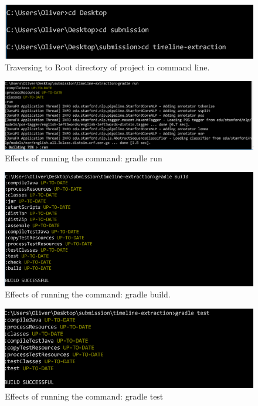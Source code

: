 \begin{figure}[H]
\caption{Traversing to Root directory of project in command line.}
\label{fig:traverseToRootDir}
\includegraphics{traverseToRootDir.PNG}
\centering
\end{figure}

\begin{figure}[H]
\caption{Effects of running the command: gradle run}
\label{fig:gradleRun}
\includegraphics[width=\linewidth]{gradleRun.PNG}
\centering
\end{figure}

\begin{figure}[H]
\caption{Effects of running the command: gradle build.}
\label{fig:gradleBuild}
\includegraphics[width=\linewidth]{gradleBuild.PNG}
\centering
\end{figure}

\begin{figure}[H]
\caption{Effects of running the command: gradle test}
\label{fig:gradleTest}
\includegraphics{gradleTest.PNG}
\centering
\end{figure}

